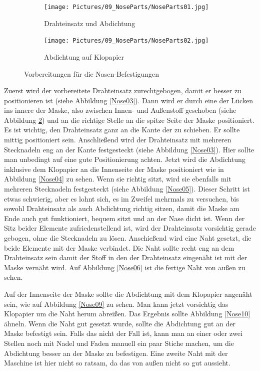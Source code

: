\documentclass[12pt,parskip=full]{scrartcl}
\begin{document}
\begin{figure}[ht]
    \vspace{0.5cm}
    \centering
    \begin{subfigure}{0.48\textwidth}
        \centering
        \texttt{[image: Pictures/09\_NoseParts/NoseParts01.jpg]}
        \caption{Drahteinsatz und Abdichtung}
        \label{Nose01}
    \end{subfigure}
    \begin{subfigure}{0.48\textwidth}
        \centering
        \texttt{[image: Pictures/09\_NoseParts/NoseParts02.jpg]}
        \caption{Abdichtung auf Klopapier}
        \label{Nose02}
    \end{subfigure}
    \caption{Vorbereitungen für die Nasen-Befestigungen}
    \label{NosePrep}
\end{figure}

Zuerst wird der vorbereitete Drahteinsatz zurechtgebogen, damit er besser zu positionieren ist (siehe Abbildung \ref{Nose03}). Dann wird er durch eine der Lücken ins innere der Maske, also zwischen Innen- und Außenstoff geschoben (siehe Abbildung \ref{Nose02}) und an die richtige Stelle an die spitze Seite der Maske positioniert. Es ist wichtig, den Drahteinsatz ganz an die Kante der zu schieben. Er sollte mittig positioniert sein. Anschließend wird der Drahteinsatz mit mehreren Stecknadeln eng an der Kante festgesteckt (siehe Abbildung \ref{Nose03}). Hier sollte man unbedingt auf eine gute Positionierung achten. Jetzt wird die Abdichtung inklusive dem Klopapier an die Innenseite der Maske positioniert wie in Abbildung \ref{Nose04} zu sehen. Wenn sie richtig sitzt, wird sie ebenfalls mit mehreren Stecknadeln festgesteckt (siehe Abbildung \ref{Nose05}). Dieser Schritt ist etwas schwierig, aber es lohnt sich, es im Zweifel mehrmals zu versuchen, bis sowohl Drahteinsatz als auch Abdichtung richtig sitzen, damit die Maske am Ende auch gut funktioniert, bequem sitzt und an der Nase dicht ist. Wenn der Sitz beider Elemente zufriedenstellend ist, wird der Drahteinsatz vorsichtig gerade gebogen, ohne die Stecknadeln zu lösen. Anschießend wird eine Naht gesetzt, die beide Elemente mit der Maske verbindet. Die Naht sollte recht eng an dem Drahteinsatz sein damit der Stoff in den der Drahteinsatz eingenäht ist mit der Maske vernäht wird. Auf Abbildung \ref{Nose06} ist die fertige Naht von außen zu sehen.\par

Auf der Innenseite der Maske sollte die Abdichtung mit dem Klopapier angenäht sein, wie auf Abbildung \ref{Nose09} zu sehen. Man kann jetzt vorsichtig das Klopapier um die Naht herum abreißen. Das Ergebnis sollte Abbildung \ref{Nose10} ähneln. Wenn die Naht gut gesetzt wurde, sollte die Abdichtung gut an der Maske befestigt sein. Falls das nicht der Fall ist, kann man an einer oder zwei Stellen noch mit Nadel und Faden manuell ein paar Stiche machen, um die Abdichtung besser an der Maske zu befestigen. Eine zweite Naht mit der Maschine ist hier nicht so ratsam, da das von außen nicht so gut aussieht. 
\end{document}
